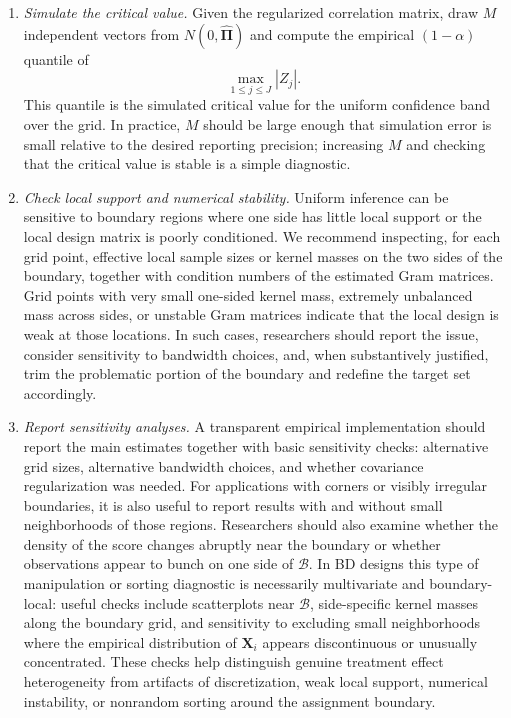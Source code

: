 \documentclass[10pt]{article}
\newcommand{\bX}{\mathbf{X}}
\newcommand{\bPi}{\boldsymbol{\Pi}}
\newcommand{\B}{\mathcal{B}}
\begin{document}
\begin{enumerate}[leftmargin=*]
    \item \textit{Simulate the critical value.}
    Given the regularized correlation matrix, draw $M$ independent vectors from $N(0,\widehat{\bPi})$ and compute the empirical $(1-\alpha)$ quantile of
    \[
        \max_{1\leq j\leq J}|Z_j|.
    \]
    This quantile is the simulated critical value for the uniform confidence band over the grid. In practice, $M$ should be large enough that simulation error is small relative to the desired reporting precision; increasing $M$ and checking that the critical value is stable is a simple diagnostic.

    \item \textit{Check local support and numerical stability.}
    Uniform inference can be sensitive to boundary regions where one side has little local support or the local design matrix is poorly conditioned. We recommend inspecting, for each grid point, effective local sample sizes or kernel masses on the two sides of the boundary, together with condition numbers of the estimated Gram matrices. Grid points with very small one-sided kernel mass, extremely unbalanced mass across sides, or unstable Gram matrices indicate that the local design is weak at those locations. In such cases, researchers should report the issue, consider sensitivity to bandwidth choices, and, when substantively justified, trim the problematic portion of the boundary and redefine the target set accordingly.

    \item \textit{Report sensitivity analyses.}
    A transparent empirical implementation should report the main estimates together with basic sensitivity checks: alternative grid sizes, alternative bandwidth choices, and whether covariance regularization was needed. For applications with corners or visibly irregular boundaries, it is also useful to report results with and without small neighborhoods of those regions. Researchers should also examine whether the density of the score changes abruptly near the boundary or whether observations appear to bunch on one side of $\B$. In BD designs this type of manipulation or sorting diagnostic is necessarily multivariate and boundary-local: useful checks include scatterplots near $\B$, side-specific kernel masses along the boundary grid, and sensitivity to excluding small neighborhoods where the empirical distribution of $\bX_i$ appears discontinuous or unusually concentrated. These checks help distinguish genuine treatment effect heterogeneity from artifacts of discretization, weak local support, numerical instability, or nonrandom sorting around the assignment boundary.

\end{enumerate}
\end{document}
